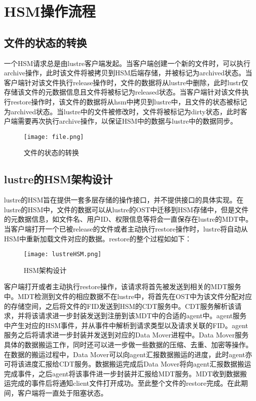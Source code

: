 \section{HSM操作流程}

\subsection{文件的状态的转换}

一个HSM请求总是由lustre客户端发起。当客户端创建一个新的文件时，可以执行archive操作，此时该文件将被拷贝到HSM后端存储，并被标记为archived状态。当客户端针对该文件执行release操作时，文件的数据将从lustre中删除，此时lustr仅存储该文件的元数据信息且文件将被标记为released状态。当客户端针对该文件执行restore操作时，该文件的数据将从hsm中拷贝到lustre中，且文件的状态被标记为archived状态。当lustre中的文件被修改时，文件将被标记为dirty状态，此时客户端需要再次执行archive操作，以保证HSM中的数据与lustre中的数据同步。 

\begin{figure}[!htb]
    \centering
    \texttt{[image: file.png]}
    \caption{文件的状态的转换}\label{fig:region-image}
\end{figure}

\subsection{lustre的HSM架构设计}

lustre的HSM旨在提供一套多层存储的操作接口，并不提供接口的具体实现。在lustre的HSM中，文件的数据可以从lustre的OST中迁移到HSM存储中，但是文件的元数据信息，如文件名、用户ID、权限信息等将会一直保存在lustre的MDT中。当客户端打开一个已被release的文件或者主动执行restore操作时，lustre将自动从HSM中重新加载文件对应的数据。restore的整个过程如如下：

\begin{figure}[!htb]
    \centering
    \texttt{[image: lustreHSM.png]}
    \caption{HSM架构设计}\label{fig:region-image}
\end{figure}

客户端打开或者主动执行restore操作，该请求将首先被发送到相关的MDT服务中。MDT检测到文件的相应数据不在lustre中，将首先在OST中为该文件分配对应的存储空间，之后将文件的FID发送到HSM的CDT服务中。CDT服务解析该请求，并将该请求进一步封装发送到注册到该MDT中的合适的agent中。agent服务中产生对应的HSM事件，并从事件中解析到请求类型以及请求关联的FID。agent服务之后将请求进一步封装并发送到对应的Data Mover进程中。Data Mover服务具体的数据搬运工作，同时还可以进一步做一些数据的压缩、去重、加密等操作。在数据的搬运过程中，Data Mover可以向agent汇报数据搬运的进度，此时agent亦可将该进度汇报给CDT服务。数据搬运完成后Data Mover将向agent汇报数据搬运完成事件，之后agent将该事件进一步封装并汇报给MDT服务。MDT收到数据搬运完成的事件后将通知client文件打开成功。至此整个文件的restore完成。在此期间，客户端将一直处于阻塞状态。 

